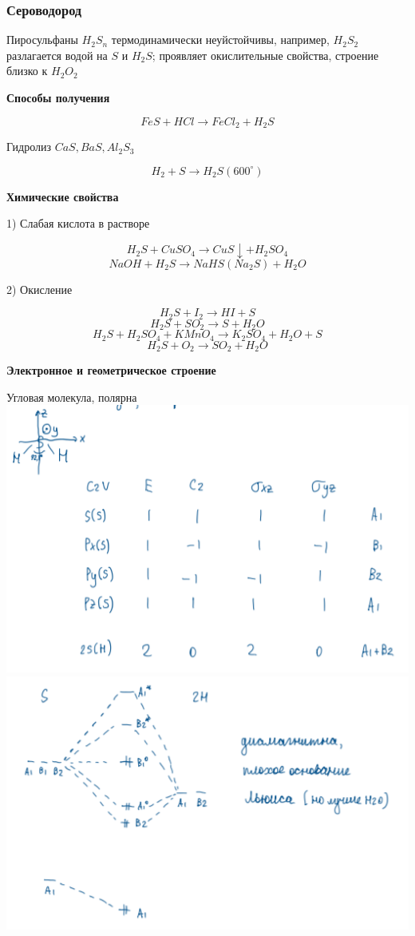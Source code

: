 \documentclass[14pt,a4paper]{scrartcl}
\begin{document}
\subsubsection{Сероводород}

Пиросульфаны $H_2S_n$ термодинамически неуйстойчивы, например,  $H_2S_2$ разлагается водой на $S$ и $H_2S$; проявляет окислительные свойства, строение близко к $H_2O_2$

\textbf{Способы получения}

$$FeS + HCl \rightarrow FeCl_2 + H_2S$$

Гидролиз $CaS, BaS, Al_2S_3$

$$H_2 + S \rightarrow H_2S (600^{\circ})$$

\textbf{Химические свойства}

1) Слабая кислота в растворе

$$H_2S + CuSO_4 \rightarrow CuS\downarrow + H_2SO_4$$
$$NaOH + H_2S \rightarrow NaHS (Na_2S) + H_2O$$

2) Окисление

$$H_2S + I_2 \rightarrow HI + S$$
$$H_2S + SO_2 \rightarrow S+ H_2O$$
$$H_2S + H_2SO_4 + KMnO_4 \rightarrow K_2SO_4 + H_2O + S$$
$$H_2S + O_2 \rightarrow SO_2 + H_2O$$

\textbf{Электронное и геометрическое строение}

Угловая молекула, полярна\\
\includegraphics{6v4.png}
\includegraphics{6v5.png}
\end{document}
